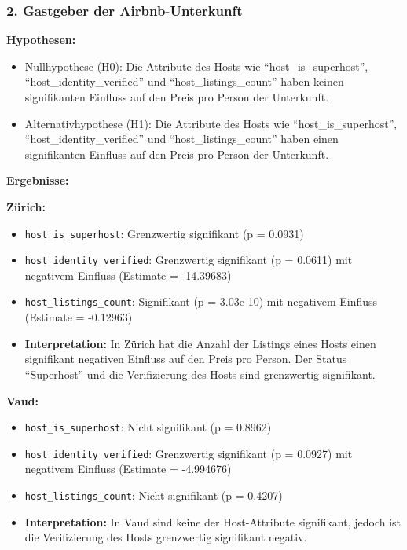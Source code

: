 \documentclass[
  journal,
]{IEEEtran}%
\providecommand{\tightlist}{%
  \setlength{\itemsep}{0pt}\setlength{\parskip}{0pt}}\usepackage{longtable,booktabs,array}
\begin{document}
\subsubsection{2. Gastgeber der
Airbnb-Unterkunft}\label{gastgeber-der-airbnb-unterkunft}

\textbf{Hypothesen:}

\begin{itemize}
\tightlist
\item
  Nullhypothese (H0): Die Attribute des Hosts wie
  ``host\_is\_superhost'', ``host\_identity\_verified'' und
  ``host\_listings\_count'' haben keinen signifikanten Einfluss auf den
  Preis pro Person der Unterkunft.
\item
  Alternativhypothese (H1): Die Attribute des Hosts wie
  ``host\_is\_superhost'', ``host\_identity\_verified'' und
  ``host\_listings\_count'' haben einen signifikanten Einfluss auf den
  Preis pro Person der Unterkunft.
\end{itemize}

\textbf{Ergebnisse:}

\textbf{Zürich:}

\begin{itemize}
\item
  \texttt{host\_is\_superhost}: Grenzwertig signifikant (p = 0.0931)
\item
  \texttt{host\_identity\_verified}: Grenzwertig signifikant (p =
  0.0611) mit negativem Einfluss (Estimate = -14.39683)
\item
  \texttt{host\_listings\_count}: Signifikant (p = 3.03e-10) mit
  negativem Einfluss (Estimate = -0.12963)
\item
  \textbf{Interpretation:} In Zürich hat die Anzahl der Listings eines
  Hosts einen signifikant negativen Einfluss auf den Preis pro Person.
  Der Status ``Superhost'' und die Verifizierung des Hosts sind
  grenzwertig signifikant.
\end{itemize}

\textbf{Vaud:}

\begin{itemize}
\item
  \texttt{host\_is\_superhost}: Nicht signifikant (p = 0.8962)
\item
  \texttt{host\_identity\_verified}: Grenzwertig signifikant (p =
  0.0927) mit negativem Einfluss (Estimate = -4.994676)
\item
  \texttt{host\_listings\_count}: Nicht signifikant (p = 0.4207)
\item
  \textbf{Interpretation:} In Vaud sind keine der Host-Attribute
  signifikant, jedoch ist die Verifizierung des Hosts grenzwertig
  signifikant negativ.
\end{itemize}
\end{document}
